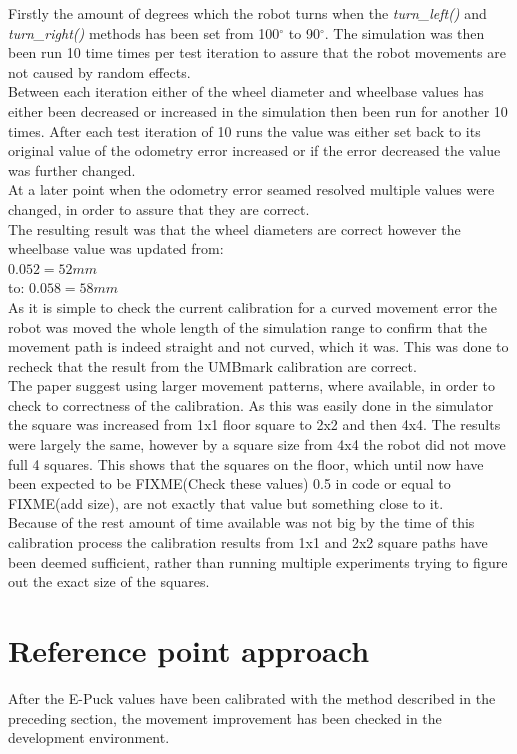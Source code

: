 Firstly the amount of degrees which the robot turns when the \textit{turn\_left()} and \textit{turn\_right()} methods has been set from 100$^{\circ}$ to 90$^{\circ}$. The simulation was then been run 10 time times per test iteration to assure that the robot movements are not caused by random effects.\\
Between each iteration either of the wheel diameter and wheelbase values has either been decreased or increased in the simulation then been run for another 10 times. After each test iteration of 10 runs the value was either set back to its original value of the odometry error increased or if the error decreased the value was further changed. \\
At a later point when the odometry error seamed resolved multiple values were changed, in order to assure that they are correct. \\
The resulting result was that the wheel diameters are correct however the wheelbase value was updated from:\\
$0.052 = 52mm$\\ 
to:
$0.058 = 58mm$\\ 
As it is simple to check the current calibration for a curved movement error the robot was moved the whole length of the simulation range to confirm that the movement path is indeed straight and not curved, which it was. This was done to recheck that the result from the UMBmark calibration are correct. \\[3ex]

The paper suggest using larger movement patterns, where available, in order to check to correctness of the calibration. As this was easily done in the simulator the square was increased from 1x1 floor square to 2x2 and then 4x4. The results were largely the same, however by a square size from 4x4 the robot did not move full 4 squares. This shows that the squares on the floor, which until now have been expected to be FIXME(Check these values) 0.5 in code or equal to FIXME(add size), are not exactly that value but something close to it. \\
Because of the rest amount of time available was not big by the time of this calibration process the calibration results from 1x1 and 2x2 square paths have been deemed sufficient, rather than running multiple experiments trying to figure out the exact size of the squares. \\

\section{Reference point approach}
After the E-Puck values have been calibrated with the method described in the preceding section, the movement improvement has been checked in the development environment. \\

